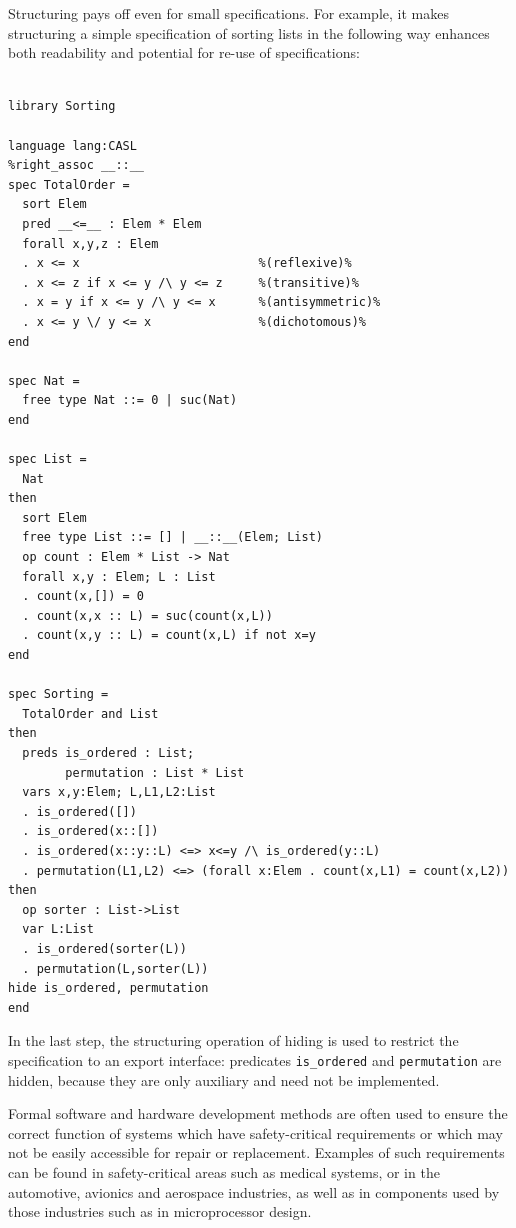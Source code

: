 \documentclass[10pt, a4paper]{isov2}
\begin{document}
Structuring pays off even for small specifications. For example, it makes
structuring a simple specification of sorting lists in the 
following way enhances both readability and potential for re-use
of specifications:

\begin{lstlisting}[basicstyle=\ttfamily\footnotesize,language=dolText,alsolanguage=CASL,escapechar=@,mathescape]	
%prefix( lang:  <http://purl.net/DOL/languages/> )%

library Sorting

language lang:CASL
%right_assoc __::__
spec TotalOrder =
  sort Elem
  pred __<=__ : Elem * Elem
  forall x,y,z : Elem
  . x <= x                         %(reflexive)%
  . x <= z if x <= y /\ y <= z     %(transitive)%
  . x = y if x <= y /\ y <= x      %(antisymmetric)%
  . x <= y \/ y <= x               %(dichotomous)%
end

spec Nat =
  free type Nat ::= 0 | suc(Nat)
end

spec List =
  Nat
then
  sort Elem
  free type List ::= [] | __::__(Elem; List)
  op count : Elem * List -> Nat
  forall x,y : Elem; L : List
  . count(x,[]) = 0
  . count(x,x :: L) = suc(count(x,L))
  . count(x,y :: L) = count(x,L) if not x=y
end

spec Sorting =
  TotalOrder and List
then
  preds is_ordered : List;
        permutation : List * List
  vars x,y:Elem; L,L1,L2:List
  . is_ordered([])
  . is_ordered(x::[])
  . is_ordered(x::y::L) <=> x<=y /\ is_ordered(y::L)
  . permutation(L1,L2) <=> (forall x:Elem . count(x,L1) = count(x,L2))
then
  op sorter : List->List
  var L:List
  . is_ordered(sorter(L))
  . permutation(L,sorter(L))
hide is_ordered, permutation
end
\end{lstlisting}

In the last step, the structuring operation of hiding is used to
restrict the specification to an export interface: 
 predicates \texttt{is\_ordered} and \texttt{permutation} are hidden, because they
are only auxiliary and need not be implemented.



\label{spec-2}
Formal software and hardware development methods are often used to
ensure the correct function of systems which have safety-critical
requirements or which may not be easily accessible for repair or
replacement.  Examples of such requirements can be found in
safety-critical areas such as medical systems, or in the automotive,
avionics and aerospace industries, as well as in components used by
those industries such as in microprocessor design.
\end{document}
